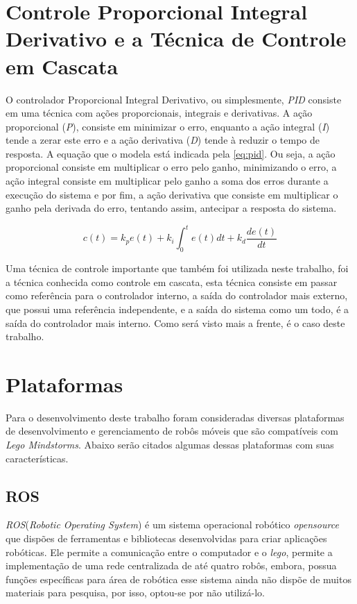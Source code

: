 \section{Controle Proporcional Integral Derivativo e a Técnica de Controle em Cascata}
\label{sec:pid}
O controlador Proporcional Integral Derivativo, ou simplesmente, \emph{PID} consiste em uma técnica com ações proporcionais, integrais e derivativas. A ação proporcional (\emph{P}), consiste em minimizar o erro, enquanto a ação integral (\emph{I}) tende a zerar este erro e a ação derivativa (\emph{D}) tende à reduzir o tempo de resposta. A equação que o modela está indicada pela \autoref{eq:pid}. Ou seja, a ação proporcional consiste em multiplicar o erro pelo ganho, minimizando o erro, a ação integral consiste em multiplicar pelo ganho a soma dos erros durante a execução do sistema e por fim, a ação derivativa que consiste em multiplicar o ganho pela derivada do erro, tentando assim, antecipar a resposta do sistema. 

\begin{equation}
c(t) = k_{p}e(t) + k_{i}\int_0^t e(t) dt + k_{d}\dfrac{de(t)}{dt}
\label{eq:pid}
\end{equation}

Uma técnica de controle importante que também foi utilizada neste trabalho, foi a técnica conhecida como controle em cascata, esta técnica consiste em passar como referência para o controlador interno, a saída do controlador mais externo, que possui uma referência independente, e a saída do sistema como um todo, é a saída do controlador mais interno. Como será visto mais a frente, é o caso deste trabalho.

\section{Plataformas}
\label{sec:plataformas}
Para o desenvolvimento deste trabalho foram consideradas diversas plataformas de desenvolvimento e gerenciamento de robôs móveis que são compatíveis com \emph{Lego Mindstorms\textregistered}. Abaixo serão citados algumas dessas plataformas com suas características.

\subsection{ROS}
\label{subsec:ROS}
\emph{ROS}(\emph{Robotic Operating System}) é um sistema operacional robótico \emph{opensource} que dispões de ferramentas e bibliotecas desenvolvidas para criar aplicações robóticas.%
Ele permite a comunicação entre o computador e o \emph{lego}, permite a implementação de uma rede centralizada de até quatro robôs, embora, possua funções específicas para área de robótica esse sistema ainda não dispõe de muitos materiais para pesquisa, por isso, optou-se por não  utilizá-lo.

